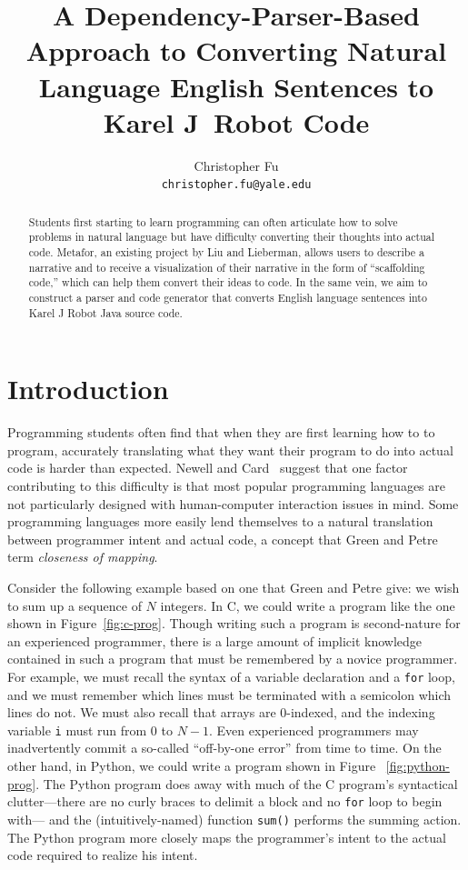 \documentclass[11pt]{article}
\title{A Dependency-Parser-Based Approach to Converting Natural Language English Sentences to Karel J\ Robot Code}
\author{
    Christopher Fu \\
    \texttt{christopher.fu@yale.edu} \\}
\date{}
\begin{document}
\maketitle
\begin{abstract}
Students first starting to learn programming can often articulate how to solve problems in natural
language but have difficulty converting their thoughts into actual code. Metafor, an existing
project by Liu and Lieberman, allows users to describe a narrative and to receive a visualization
of their narrative in the form of ``scaffolding code,'' which can help them convert their ideas to
code. In the same vein, we aim to construct a parser and code generator that converts English
language sentences into Karel J Robot Java source code.
\end{abstract}

\section{Introduction}
Programming students often find that when they are first learning how to to program, accurately
translating what they want their program to do into actual code is harder than expected. Newell and
Card~ suggest that one factor contributing to this difficulty is that most
popular programming languages are not particularly designed with human-computer interaction issues
in mind. Some programming languages more easily lend themselves to a natural translation between
programmer intent and actual code, a concept that Green and Petre~ term
\emph{closeness of mapping}.

Consider the following example based on one that Green and Petre give: we wish to sum up a sequence
of $N$ integers. In C, we could write a program like the one shown in Figure~\ref{fig:c-prog}.
Though writing such a program is second-nature for an experienced programmer, there is a large
amount of implicit knowledge contained in such a program that must be remembered by a novice
programmer. For example, we must recall the syntax of a variable declaration and a \texttt{for}
loop, and we must remember which lines must be terminated with a semicolon which lines do not. We
must also recall that arrays are 0-indexed, and the indexing variable \texttt{i} must run from 0 to
$N - 1$. Even experienced programmers may inadvertently commit a so-called ``off-by-one error''
from time to time. On the other hand, in Python, we could write a program shown in Figure
~\ref{fig:python-prog}. The Python program does away with much of the C program's syntactical
clutter---there are no curly braces to delimit a block and no \texttt{for} loop to begin with---
and the (intuitively-named) function \texttt{sum()} performs the summing action.  The Python
program more closely maps the programmer's intent to the actual code required to realize his
intent.
\end{document}
